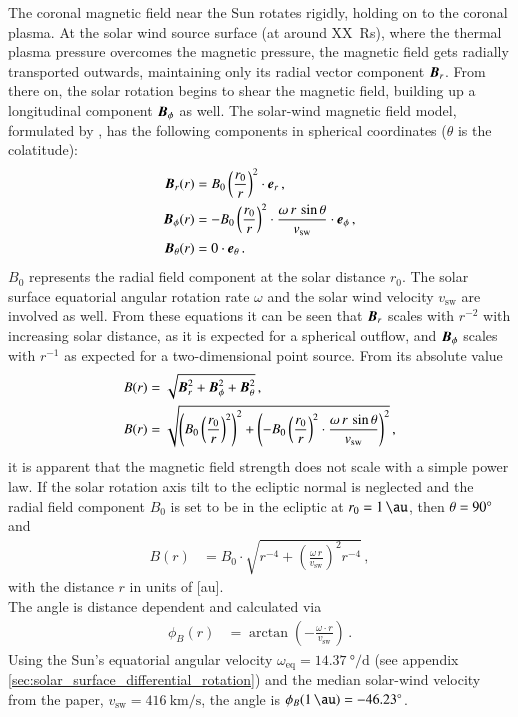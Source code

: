The coronal magnetic field near the Sun rotates rigidly, holding on to the coronal plasma. At the solar wind source surface (at around XX~Rs), where the thermal plasma pressure overcomes the magnetic pressure, the magnetic field gets radially transported outwards, maintaining only its radial vector component $\boldsymbol{B}_r$. From there on, the solar rotation begins to shear the magnetic field, building up a longitudinal component $\boldsymbol{B}_\phi$ as well. The solar-wind magnetic field model, formulated by \citet{Parker1958}, has the following components in spherical coordinates ($\theta$ is the colatitude):
\begin{align}
	\boldsymbol{B}_r(r) &= B_0 \left(\frac{r_0}{r}\right)^2 \cdot \boldsymbol{e}_r\,,\\
	\boldsymbol{B}_\phi(r) &= -B_0 \left(\frac{r_0}{r}\right)^2 \cdot \frac{\omega\,r\,\sin\theta}{v_\text{sw}} \cdot \boldsymbol{e}_\phi	\,,	\label{eq:b_phi_vector}\\
	\boldsymbol{B}_\theta(r) &= 0 \cdot \boldsymbol{e}_\theta\,.
\end{align}
$B_0$ represents the radial field component at the solar distance $r_0$. The solar surface equatorial angular rotation rate $\omega$ and the solar wind velocity $v_\text{sw}$ are involved as well. From these equations it can be seen that $\boldsymbol{B}_r$ scales with $r^{-2}$ with increasing solar distance, as it is expected for a spherical outflow, and $\boldsymbol{B}_\phi$ scales with $r^{-1}$ as expected for a two-dimensional point source. From its absolute value
\begin{align}
	B(r) &= \sqrt{\boldsymbol{B}_r^2 + \boldsymbol{B}_\phi^2 + \boldsymbol{B}_\theta^2}\,,\\
	B(r) &= \sqrt{\left(B_0 \left(\frac{r_0}{r}\right)^2\right)^2 + \left(-B_0 \left(\frac{r_0}{r}\right)^2 \cdot \frac{\omega\,r\,\sin\theta}{v_\text{sw}}\right)^2}\,,
\end{align}
it is apparent that the magnetic field strength does not scale with a simple power law. If the solar rotation axis tilt to the ecliptic normal is neglected and the radial field component $B_0$ is set to be in the ecliptic at $r_0 = \SI{1}{\au}$, then $\theta = 90\degree$ and
\begin{align}
	B(r) &= B_0 \cdot \sqrt{r^{-4} + \left(\frac{\omega\,r}{v_\text{sw}}\right)^2 r^{-4}}\,,	\label{eq:B_1au}
\end{align}
with the distance $r$ in units of [au].\\

The angle is distance dependent and calculated via
\begin{align}
	\phi_B(r) &= \arctan\left(-\frac{\omega \cdot r}{v_\text{sw}}\right)\,.
\end{align}
Using the Sun's equatorial angular velocity $\omega_\text{eq} = \SI{14.37}{\degree\per\day}$ (see appendix \autoref{sec:solar_surface_differential_rotation}) and the median solar-wind velocity from the paper, $v_\text{sw} = \SI{416}{\km\per\s}$, the angle is $\phi_B(\SI{1}{\au}) = \SI{-46.23}{\degree}$.\\

